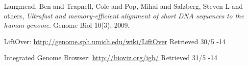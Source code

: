   Langmead, Ben and Trapnell, Cole and Pop, Mihai and Salzberg, Steven L and others,
  \emph{Ultrafast and memory-efficient alignment of short DNA sequences to the human genome}.
  Genome Biol 10(3),
  2009.

  LiftOver: \url{http://genome.sph.umich.edu/wiki/LiftOver} Retrieved 30/5 -14

  Integrated Genome Browser: \url{http://bioviz.org/igb/} Retrieved 31/5 -14